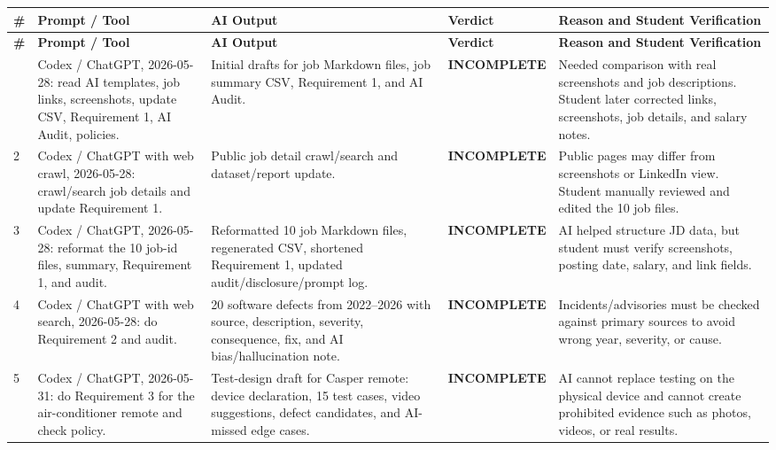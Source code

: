 \documentclass[12pt, a4paper]{article}
\newcommand{\incompl}{\textcolor{WarnOrange}{\textbf{INCOMPLETE}}}
\begin{document}
{\footnotesize
\setlength{\tabcolsep}{3pt}
\renewcommand{\arraystretch}{1.12}
\begin{longtable}{@{} C{0.6cm} L{2.8cm} L{3.1cm} C{2.7cm} L{4.8cm} @{}}
\toprule
{}
\textbf{\#} & \textbf{Prompt / Tool} & \textbf{AI Output} & \textbf{Verdict} & \textbf{Reason and Student Verification} \\
\midrule
\endfirsthead
\toprule
{}
\textbf{\#} & \textbf{Prompt / Tool} & \textbf{AI Output} & \textbf{Verdict} & \textbf{Reason and Student Verification} \\
\midrule
\endhead
\bottomrule
{} & Codex / ChatGPT, 2026-05-28: read AI templates, job links, screenshots, update CSV, Requirement 1, AI Audit, policies. & Initial drafts for job Markdown files, job summary CSV, Requirement 1, and AI Audit. & \incompl{} & Needed comparison with real screenshots and job descriptions. Student later corrected links, screenshots, job details, and salary notes. \\[3pt]
2 & Codex / ChatGPT with web crawl, 2026-05-28: crawl/search job details and update Requirement 1. & Public job detail crawl/search and dataset/report update. & \incompl{} & Public pages may differ from screenshots or LinkedIn view. Student manually reviewed and edited the 10 job files. \\[3pt]
3 & Codex / ChatGPT, 2026-05-28: reformat the 10 job-id files, summary, Requirement 1, and audit. & Reformatted 10 job Markdown files, regenerated CSV, shortened Requirement 1, updated audit/disclosure/prompt log. & \incompl{} & AI helped structure JD data, but student must verify screenshots, posting date, salary, and link fields. \\[3pt]
4 & Codex / ChatGPT with web search, 2026-05-28: do Requirement 2 and audit. & 20 software defects from 2022--2026 with source, description, severity, consequence, fix, and AI bias/hallucination note. & \incompl{} & Incidents/advisories must be checked against primary sources to avoid wrong year, severity, or cause. \\[3pt]
5 & Codex / ChatGPT, 2026-05-31: do Requirement 3 for the air-conditioner remote and check policy. & Test-design draft for Casper remote: device declaration, 15 test cases, video suggestions, defect candidates, and AI-missed edge cases. & \incompl{} & AI cannot replace testing on the physical device and cannot create prohibited evidence such as photos, videos, or real results. \\[3pt]

\end{longtable}}
\end{document}
